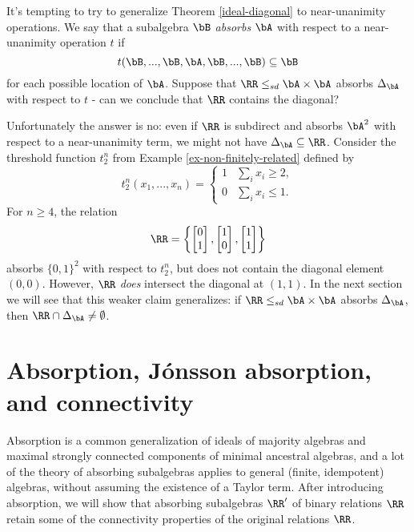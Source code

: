 \begin{rem} It's tempting to try to generalize Theorem \ref{ideal-diagonal} to near-unanimity operations. We say that a subalgebra $\bB$ \emph{absorbs} $\bA$ with respect to a near-unanimity operation $t$ if
\[
t(\bB, ..., \bB, \bA, \bB, ..., \bB) \subseteq \bB
\]
for each possible location of $\bA$. Suppose that $\RR \le_{sd} \bA \times \bA$ absorbs $\Delta_{\bA}$ with respect to $t$ - can we conclude that $\RR$ contains the diagonal?

Unfortunately the answer is no: even if $\RR$ is subdirect and absorbs $\bA^2$ with respect to a near-unanimity term, we might not have $\Delta_{\bA} \subseteq \RR$. Consider the threshold function $t_2^n$ from Example \ref{ex-non-finitely-related} defined by
\[
t_2^n(x_1, ..., x_n) = \begin{cases} 1 & \sum_i x_i \ge 2,\\ 0 & \sum_i x_i \le 1.\end{cases}
\]
For $n \ge 4$, the relation
\[
\RR = \left\{\begin{bmatrix}0 \\ 1\end{bmatrix}, \begin{bmatrix}1 \\ 0\end{bmatrix}, \begin{bmatrix}1 \\ 1\end{bmatrix}\right\}
\]
absorbs $\{0,1\}^2$ with respect to $t_2^n$, but does not contain the diagonal element $(0,0)$. However, $\RR$ \emph{does} intersect the diagonal at $(1,1)$. In the next section we will see that this weaker claim generalizes: if $\RR \le_{sd} \bA \times \bA$ absorbs $\Delta_{\bA}$, then $\RR \cap \Delta_{\bA} \ne \emptyset$.
\end{rem}


\section{Absorption, J\'onsson absorption, and connectivity}

Absorption is a common generalization of ideals of majority algebras and maximal strongly connected components of minimal ancestral algebras, and a lot of the theory of absorbing subalgebras applies to general (finite, idempotent) algebras, without assuming the existence of a Taylor term. After introducing absorption, we will show that absorbing subalgebras $\RR'$ of binary relations $\RR$ retain some of the connectivity properties of the original relations $\RR$.

